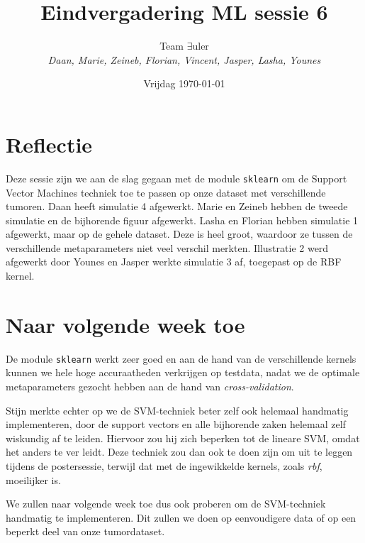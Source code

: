 \documentclass{article}
\title{Eindvergadering ML sessie 6}
\author{Team $\exists$uler \\
	\textit{Daan, Marie, Zeineb, Florian, Vincent, Jasper, Lasha, Younes}}
\date{Vrijdag \today}
\begin{document}
	
\maketitle

\section*{Reflectie}

Deze sessie zijn we aan de slag gegaan met de module \texttt{sklearn} om de Support Vector Machines techniek toe te passen op onze dataset met verschillende tumoren. Daan heeft simulatie 4 afgewerkt. Marie en Zeineb hebben de tweede simulatie en de bijhorende figuur afgewerkt. Lasha en Florian hebben simulatie 1 afgewerkt, maar op de gehele dataset. Deze is heel groot, waardoor ze tussen de verschillende metaparameters niet veel verschil merkten. Illustratie 2 werd afgewerkt door Younes en Jasper werkte simulatie 3 af, toegepast op de RBF kernel.

\section*{Naar volgende week toe}

De module \texttt{sklearn} werkt zeer goed en aan de hand van de verschillende kernels kunnen we hele hoge accuraatheden verkrijgen op testdata, nadat we de optimale metaparameters gezocht hebben aan de hand van \textit{cross-validation}.

Stijn merkte echter op we de SVM-techniek beter zelf ook helemaal handmatig implementeren, door de support vectors en alle bijhorende zaken helemaal zelf wiskundig af te leiden.
Hiervoor zou hij zich beperken tot de lineare SVM, omdat het anders te ver leidt. Deze techniek zou dan ook te doen zijn om uit te leggen tijdens de postersessie, terwijl dat met de ingewikkelde kernels, zoals \textit{rbf}, moeilijker is.

We zullen naar volgende week toe dus ook proberen om de SVM-techniek handmatig te implementeren. Dit zullen we doen op eenvoudigere data of op een beperkt deel van onze tumordataset.
\end{document}
